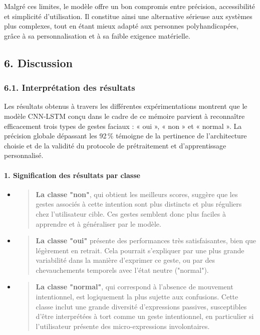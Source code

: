 \documentclass[
]{article}
\begin{document}
Malgré ces limites, le modèle offre un bon compromis entre précision, accessibilité et simplicité d'utilisation. Il constitue ainsi une alternative sérieuse aux systèmes plus complexes, tout en étant mieux adapté aux personnes polyhandicapées, grâce à sa personnalisation et à sa faible exigence matérielle.

\hypertarget{discussion}{%
\subsection{6. Discussion}\label{discussion}}

\hypertarget{interpruxe9tation-des-ruxe9sultats}{%
\subsubsection{6.1. Interprétation des résultats}\label{interpruxe9tation-des-ruxe9sultats}}

Les résultats obtenus à travers les différentes expérimentations montrent que le modèle CNN-LSTM conçu dans le cadre de ce mémoire parvient à reconnaître efficacement trois types de gestes faciaux : « oui », « non » et « normal ». La précision globale dépassant les 92\,\% témoigne de la pertinence de l'architecture choisie et de la validité du protocole de prétraitement et d'apprentissage personnalisé.

\hypertarget{signification-des-ruxe9sultats-par-classe}{%
\paragraph{\texorpdfstring{\textbf{1. Signification des résultats par classe}}{1. Signification des résultats par classe}}\label{signification-des-ruxe9sultats-par-classe}}

\begin{itemize}
\item
  \begin{quote}
  \textbf{La classe "non"}, qui obtient les meilleurs scores, suggère que les gestes associés à cette intention sont plus distincts et plus réguliers chez l'utilisateur cible. Ces gestes semblent donc plus faciles à apprendre et à généraliser par le modèle.
  \end{quote}
\item
  \begin{quote}
  \textbf{La classe "oui"} présente des performances très satisfaisantes, bien que légèrement en retrait. Cela pourrait s'expliquer par une plus grande variabilité dans la manière d'exprimer ce geste, ou par des chevauchements temporels avec l'état neutre ("normal").
  \end{quote}
\item
  \begin{quote}
  \textbf{La classe "normal"}, qui correspond à l'absence de mouvement intentionnel, est logiquement la plus sujette aux confusions. Cette classe inclut une grande diversité d'expressions passives, susceptibles d'être interprétées à tort comme un geste intentionnel, en particulier si l'utilisateur présente des micro-expressions involontaires.
  \end{quote}
\end{itemize}
\end{document}

